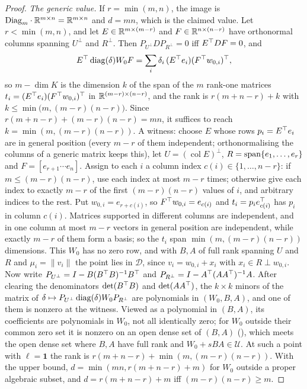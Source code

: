 \begin{proof}
\emph{The generic value.} If $r=\min(m,n)$, the image is $\mathrm{Diag}_m\cdot\mathbb{R}^{m\times n}=\mathbb{R}^{m\times n}$ and $d=mn$,
which is the claimed value. Let $r<\min(m,n)$, and let $E\in\mathbb{R}^{m\times(m-r)}$ and $F\in\mathbb{R}^{n\times(n-r)}$ have orthonormal
columns spanning $U^\perp$ and $R^\perp$. Then $P_{U^\perp}DP_{R^\perp}=0$ iff $E^{\top} DF=0$, and
\begin{equation*}
  E^{\top}\operatorname{diag}(\delta)W_0F=\sum_i\delta_i\,(E^{\top} e_i)(F^{\top} w_{0,i})^{\top} ,
\end{equation*}
so $m-\dim K$ is the dimension $k$ of the span of the $m$ rank-one matrices $t_i=(E^{\top} e_i)(F^{\top} w_{0,i})^{\top}$ in
$\mathbb{R}^{(m-r)\times(n-r)}$, and the rank is $r(m+n-r)+k$ with $k\le\min\big(m,(m-r)(n-r)\big)$. Since
$r(m+n-r)+(m-r)(n-r)=mn$, it suffices to reach $k=\min(m,(m-r)(n-r))$. A witness: choose $E$ whose rows
$p_i=E^{\top} e_i$ are in general position (every $m-r$ of them independent; orthonormalising the columns of a generic matrix keeps
this), let $U=(\operatorname{col}E)^\perp$, $R=\operatorname{span}\{e_1,\dots,e_r\}$ and $F=[e_{r+1}\cdots e_n]$. Assign to each $i$ a
column index $c(i)\in\{1,\dots,n-r\}$: if $m\le(m-r)(n-r)$, use each index at most $m-r$ times; otherwise give each index to
exactly $m-r$ of the first $(m-r)(n-r)$ values of $i$, and arbitrary indices to the rest. Put $w_{0,i}=e_{r+c(i)}$, so $F^{\top} w_{0,i}=e_{c(i)}$ and $t_i=p_ie_{c(i)}^{\top}$ has
$p_i$ in column $c(i)$. Matrices supported in different columns are independent, and in one column at most $m-r$ vectors in
general position are independent, while exactly $m-r$ of them form a basis; so the $t_i$ span $\min(m,(m-r)(n-r))$
dimensions. This $W_0$ has no zero row, and with
$B,A$ of full rank spanning $U$ and $R$ and $\mu_i=\lVert v_i\rVert$ the point lies in $\mathcal D$, since $v_i=w_{0,i}+x_i$
with $x_i\in R\perp w_{0,i}$. Now write $P_{U^\perp}=I-B(B^{\top} B)^{-1}B^{\top}$ and $P_{R^\perp}=I-A^{\top}(AA^{\top})^{-1}A$. After clearing
the denominators $\det(B^{\top} B)$ and $\det(AA^{\top})$, the $k\times k$ minors of the matrix of $\delta\mapsto
P_{U^\perp}\operatorname{diag}(\delta)W_0P_{R^\perp}$ are polynomials in $(W_0,B,A)$, and one of them is nonzero at the witness. Viewed as a
polynomial in $(B,A)$, its coefficients are polynomials in $W_0$, not all identically zero; for $W_0$ outside their common
zero set it is nonzero on an open dense set of $(B,A)$ (), which meets the open dense set where $B,A$ have full
rank and $W_0+sBA\in\mathcal U$. At such a point with $\ell=\mathbf 1$ the rank is $r(m+n-r)+\min(m,(m-r)(n-r))$. With the
upper bound, $d=\min(mn,r(m+n-r)+m)$ for $W_0$ outside a proper algebraic subset, and $d=r(m+n-r)+m$ iff $(m-r)(n-r)\ge m$.


\end{proof}
